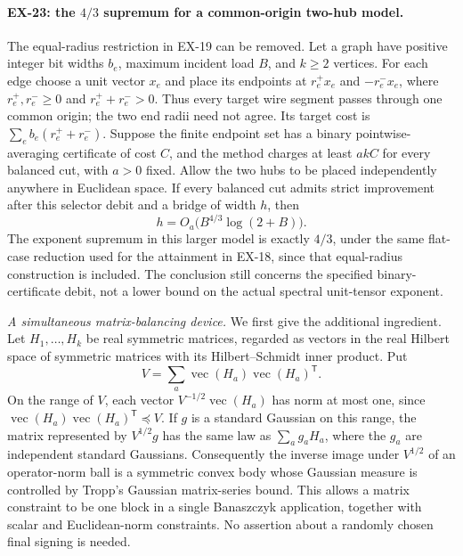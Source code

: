 \paragraph{EX-23: the $4/3$ supremum for a common-origin two-hub model.}
The equal-radius restriction in EX-19 can be removed. Let a graph have
positive integer bit widths $b_e$, maximum incident load $B$, and $k\geq2$
vertices. For each edge choose a unit vector $x_e$ and place its endpoints
at $r_e^+x_e$ and $-r_e^-x_e$, where $r_e^+,r_e^-\geq0$ and
$r_e^++r_e^->0$. Thus every target wire segment passes through one common
origin; the two end radii need not agree. Its target cost is
$\sum_e b_e(r_e^++r_e^-)$. Suppose the finite endpoint set has a binary
pointwise-averaging certificate of cost $C$, and the method charges at
least $akC$ for every balanced cut, with $a>0$ fixed. Allow the two hubs
to be placed independently anywhere in Euclidean space. If every
balanced cut admits strict improvement after this selector debit and a
bridge of width $h$, then
\[
 h=O_a\bigl(B^{4/3}\log(2+B)\bigr).
\]
The exponent supremum in this larger model is exactly $4/3$, under the
same flat-case reduction used for the attainment in EX-18, since that
equal-radius construction is included. The conclusion still
concerns the specified binary-certificate debit, not a lower bound on
the actual spectral unit-tensor exponent.

\emph{A simultaneous matrix-balancing device.}
We first give the additional ingredient. Let $H_1,\ldots,H_k$ be real
symmetric matrices, regarded as vectors in the real Hilbert space of
symmetric matrices with its Hilbert--Schmidt inner product. Put
\[
 V=\sum_a \operatorname{vec}(H_a)\operatorname{vec}(H_a)^{\mathsf T}.
\]
On the range of $V$, each vector
$V^{-1/2}\operatorname{vec}(H_a)$ has norm at most one, since
$\operatorname{vec}(H_a)\operatorname{vec}(H_a)^{\mathsf T}\preceq V$.
If $g$ is a standard Gaussian on this range, the matrix represented by
$V^{1/2}g$ has the same law as $\sum_a g_aH_a$, where the $g_a$ are
independent standard Gaussians. Consequently the inverse image under
$V^{1/2}$ of an operator-norm ball is a symmetric convex body whose
Gaussian measure is controlled by Tropp's Gaussian matrix-series
bound. This allows a matrix constraint to be one block in a single
Banaszczyk application, together with scalar and Euclidean-norm
constraints. No assertion about a randomly chosen final signing is
needed.

